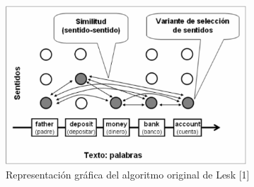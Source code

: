   \begin{figure}[h!]
    \begin{center}
    \includegraphics[angle=0, width=9cm]{Graficos/algoritmo_lesk}
    \caption{Representación gráfica del algoritmo original de Lesk [1]}
    \label{fig:algoritmo_lesk}
    \end{center}
  \end{figure}

